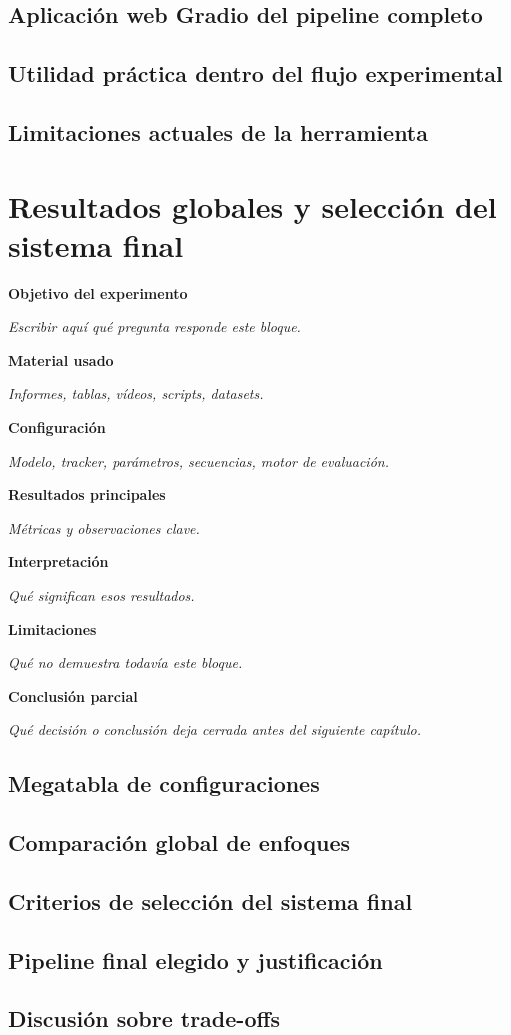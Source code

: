 \documentclass[12pt, a4paper, twoside]{article}
\newcommand{\templatefield}[2]{%
	\textbf{#1}\par
	{\color{gray!70!black}\emph{#2}}\par\vspace{0.5em}%
}
\newcommand{\experimentchaptertemplate}{%
	\begin{chaptertemplatebox}
		\templatefield{Objetivo del experimento}{Escribir aquí qué pregunta responde este bloque.}
		\templatefield{Material usado}{Informes, tablas, vídeos, scripts, datasets.}
		\templatefield{Configuración}{Modelo, tracker, parámetros, secuencias, motor de evaluación.}
		\templatefield{Resultados principales}{Métricas y observaciones clave.}
		\templatefield{Interpretación}{Qué significan esos resultados.}
		\templatefield{Limitaciones}{Qué no demuestra todavía este bloque.}
		\templatefield{Conclusión parcial}{Qué decisión o conclusión deja cerrada antes del siguiente capítulo.}
	\end{chaptertemplatebox}%
}
\begin{document}
	\subsection{Aplicación web Gradio del pipeline completo}
	\subsection{Utilidad práctica dentro del flujo experimental}
	\subsection{Limitaciones actuales de la herramienta}
	
	\newpage
	
	
	\section{Resultados globales y selección del sistema final}
	
	\experimentchaptertemplate
	
	\subsection{Megatabla de configuraciones}
	\subsection{Comparación global de enfoques}
	\subsection{Criterios de selección del sistema final}
	\subsection{Pipeline final elegido y justificación}
	\subsection{Discusión sobre trade-offs}
	
\end{document}
